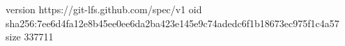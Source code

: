 version https://git-lfs.github.com/spec/v1
oid sha256:7ee6d4fa12e8b45ee0ee6da2ba423e145e9c74adedc6f1b18673ec975f1c4a57
size 337711
